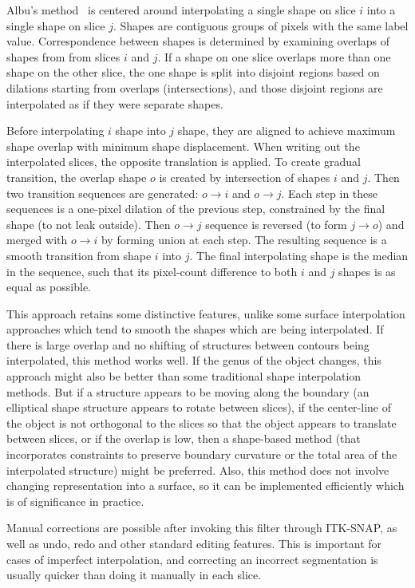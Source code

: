 \documentclass{InsightArticle}
\begin{document}
Albu's method~\cite{Albu2008} is centered around interpolating a single shape on
slice $i$ into a single shape on slice $j$.
Shapes are contiguous groups of pixels with the same label value.
Correspondence between shapes is determined by examining overlaps
of shapes from from slices $i$ and $j$.
If a shape on one slice overlaps more than one shape on the other slice,
the one shape is split into disjoint regions based on dilations
starting from overlaps (intersections),
and those disjoint regions are interpolated as if they were separate shapes.

Before interpolating $i$ shape into $j$ shape, they are aligned
to achieve maximum shape overlap with minimum shape displacement.
When writing out the interpolated slices, the opposite translation is applied.
To create gradual transition, the overlap shape $o$ is created
by intersection of shapes $i$ and $j$.
Then two transition sequences are generated: $o\rightarrow i$ and $o\rightarrow j$.
Each step in these sequences is a one-pixel dilation of the previous step,
constrained by the final shape (to not leak outside).
Then $o\rightarrow j$ sequence is reversed (to form $j\rightarrow o$) and
merged with $o\rightarrow i$ by forming union at each step.
The resulting sequence is a smooth transition from shape $i$ into $j$.
The final interpolating shape is the median in the sequence, such that its
pixel-count difference to both $i$ and $j$ shapes is as equal as possible.

This approach retains some distinctive features, unlike some surface interpolation
approaches which tend to smooth the shapes which are being interpolated.
If there is large overlap and no shifting of structures
between contours being interpolated, this method works well.
If the genus of the object changes, this approach might also be better
than some traditional shape interpolation methods.
But if a structure appears to be moving along the boundary
(an elliptical shape structure appears to rotate between slices),
if the center-line of the object is not orthogonal to the slices
so that the object appears to translate between slices, or if the overlap is low,
then a shape-based method (that incorporates constraints to preserve
boundary curvature or the total area of the interpolated structure) might be preferred.
Also, this method does not involve changing representation into a surface,
so it can be implemented efficiently which is of significance in practice.

Manual corrections are possible after invoking this filter through ITK-SNAP,
as well as undo, redo and other standard editing features.
This is important for cases of imperfect interpolation,
and correcting an incorrect segmentation is usually quicker than
doing it manually in each slice.
\end{document}
